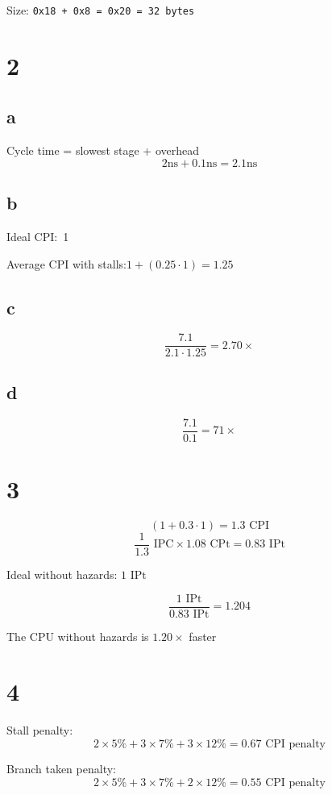 \documentclass{article}
\begin{document}
\begin{multicols*}{2}
    Size:
    \verb|0x18 + 0x8 = 0x20 = 32 bytes|

    \section*{2}
    \subsection*{a}
    Cycle time = slowest stage + overhead
    \[
        2\si{\nano\second} + 0.1 \si{\nano\second} = 2.1 \si{\nano\second}
    \]
    \subsection*{b}

    Ideal CPI:~1

    Average CPI with stalls:\(1 + (0.25 \cdot 1 ) = 1.25\)

    \subsection*{c}
    \[
        \frac{7.1}{2.1 \cdot 1.25} = 2.70\times
    \]

    \subsection*{d}
    \[
        \frac{7.1}{0.1} = 71\times
    \]

    \section*{3}
    \[(1+0.3\cdot 1) = 1.3 \text{ CPI}\]
    \[\frac{1}{1.3} \text{ IPC} \times 1.08 \text{ CPt} = 0.83 \text{ IPt}\]

    Ideal without hazards: \(1 \text{ IPt}\)

    \[\frac{1 \text{ IPt}}{0.83 \text{ IPt}} = 1.204\]

    The CPU without hazards is \(1.20\times \) faster

    \section*{4}
    Stall penalty:
    \[
        2\times 5\% + 3 \times 7\% + 3\times 12\% = 0.67 \text{ CPI penalty}
    \]

    Branch taken penalty:
    \[
        2\times 5\% + 3 \times 7\% + 2\times 12\% = 0.55 \text{ CPI penalty}
    \]


\end{multicols*}
\end{document}
